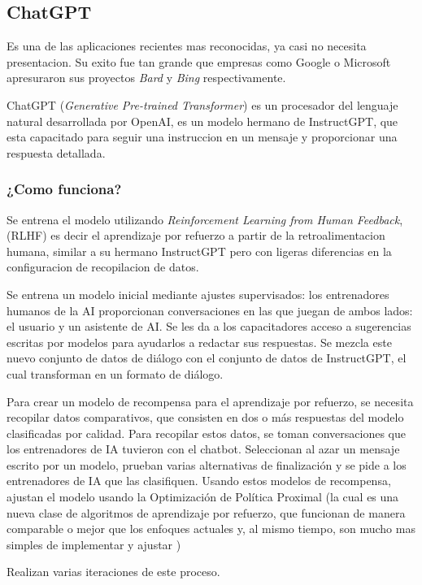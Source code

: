 \documentclass[runningheads]{llncs} %
\begin{document}
\subsection{ChatGPT}
Es una de las aplicaciones recientes mas reconocidas, ya casi no necesita presentacion.
Su exito fue tan grande que empresas como Google o Microsoft apresuraron sus proyectos
\textit{Bard} y \textit{Bing} respectivamente.

ChatGPT (\textit{Generative Pre-trained Transformer}) es un procesador del lenguaje natural
desarrollada por OpenAI, es un modelo hermano de InstructGPT, que esta capacitado
para seguir una instruccion en un mensaje y proporcionar una respuesta detallada.
\cite{ej-chatgpt}
\subsubsection{¿Como funciona?}
Se entrena el modelo utilizando \textit{Reinforcement Learning from Human Feedback}, 
(RLHF) es decir el aprendizaje por refuerzo a partir de la retroalimentacion humana,
similar a su hermano InstructGPT pero con ligeras diferencias en la configuracion de
recopilacion de datos. \cite{ej-chatgpt}

Se entrena un modelo inicial mediante ajustes supervisados: los entrenadores humanos
de la AI proporcionan conversaciones en las que juegan de ambos lados: el usuario
y un asistente de AI. Se les da a los capacitadores acceso a sugerencias escritas
por modelos para ayudarlos a redactar sus respuestas. 
Se mezcla este nuevo conjunto de datos de diálogo con el conjunto de datos de InstructGPT, 
el cual transforman en un formato de diálogo. \cite{ej-chatgpt}

Para crear un modelo de recompensa para el aprendizaje por refuerzo, 
se necesita recopilar datos comparativos, que consisten en dos o más respuestas 
del modelo clasificadas por calidad. Para recopilar estos datos, se toman conversaciones 
que los entrenadores de IA tuvieron con el chatbot. Seleccionan al azar un mensaje 
escrito por un modelo, prueban varias alternativas de finalización y se pide a los 
entrenadores de IA que las clasifiquen. Usando estos modelos de recompensa, 
ajustan el modelo usando la Optimización de Política Proximal (la cual es
una nueva clase de algoritmos de aprendizaje por refuerzo, que funcionan de manera
comparable o mejor que los enfoques actuales y, al mismo tiempo, son mucho mas
simples de implementar y ajustar \cite{def-PPO})

Realizan varias iteraciones de este proceso. \cite{ej-chatgpt}
\end{document}
